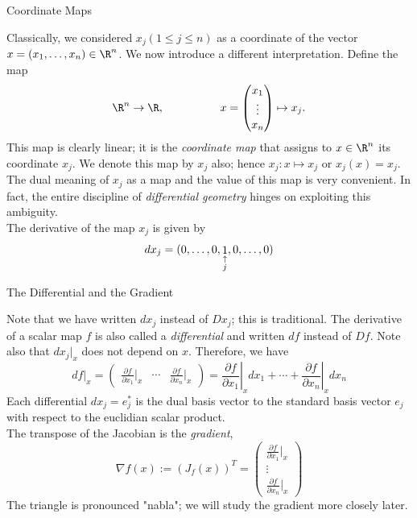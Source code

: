\documentclass[smaller,hyperref={CJKbookmarks=true}]{beamer}
\begin{document}
\begin{frame}[t]{Coordinate Maps}
\begin{spacing}{1.05}
Classically, we considered $x_j(1\leq j\leq n)$ as a coordinate of the vector $x=(x_1,\ldots,x_n)\in\R^n$. We now introduce a dif{}ferent interpretation. Define the map
\[\R^n\to\R,\qquad\qquad\quad
x=\begin{pmatrix}
    x_1 \\
    \vdots \\
    x_n
  \end{pmatrix}\mapsto x_j.\]
This map is clearly linear; it is the \emph{coordinate map} that assigns to $x\in\R^n$ its coordinate $x_j$. We denote this map by $x_j$ also; hence $x_j:x\mapsto x_j$ or $x_j(x)=x_j$. The dual meaning of $x_j$ as a map and the value of this map is very convenient. In fact, the entire discipline of \emph{dif{}ferential geometry} hinges
on exploiting this ambiguity.\\[6pt]
The derivative of the map $x_j$ is given by
\setcounter{equation}{0}
\begin{equation}\label{2.4.1}
  dx_j=(0,\ldots,0,\mathop{1}_{\begin{subarray}
                                 ~\uparrow\\
                                 j
                               \end{subarray}},0,\ldots,0)
\end{equation}
\end{spacing}
\end{frame}
\begin{frame}[t]{The Dif{}ferential and the Gradient}
\begin{spacing}{1.05}
Note that we have written $dx_j$ instead of $Dx_j$; this is traditional. The derivative of a scalar map $f$ is also called a \emph{dif{}ferential} and written $df$ instead of $Df$. Note also that $dx_j|_x$ does not depend on $x$. Therefore, we have
\[df|_x=\begin{pmatrix}
          \frac{\partial f}{\partial x_1}\big|_x & \cdots & \frac{\partial f}{\partial x_n}\big|_x
        \end{pmatrix}=\left.\frac{\partial f}{\partial x_1}\right|_x dx_1+\cdots+\left.\frac{\partial f}{\partial x_n}\right|_x dx_n\]
Each dif{}ferential $dx_j=e_j^*$ is the dual basis vector to the standard basis vector $e_j$ with respect to the euclidian scalar product.\\[5pt]
The transpose of the Jacobian is the \emph{gradient},
\[\nabla f(x):=(J_f(x))^T=\begin{pmatrix}
                            \frac{\partial f}{\partial x_1}\big|_x \\
                            \vdots
                             \\
                            \frac{\partial f}{\partial x_n}\big|_x
                          \end{pmatrix}\]
The triangle is pronounced "nabla"; we will study the gradient more closely later.
\end{spacing}
\end{frame}
\end{document}
